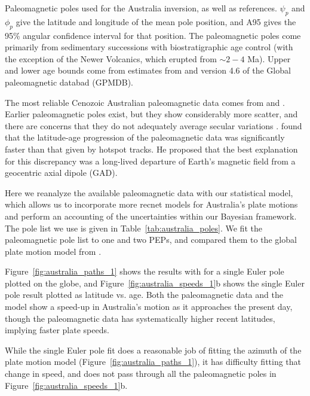 \documentclass[preprint,12pt,authoryear]{elsarticle}
\begin{document}
\begin{table}
\scriptsize

\caption{Paleomagnetic poles used for the Australia inversion, as well as references. 
$\psi_p$ and $\phi_p$ give the latitude and longitude of the mean pole position, and A95 gives the 95\% angular confidence interval for that position.
The paleomagnetic poles come primarily from sedimentary successions with biostratigraphic age control 
(with the exception of the Newer Volcanics, which erupted from $\sim2-4$ Ma).
Upper and lower age bounds come from estimates from \citet{idnurm1985lateI} and version 4.6 of the Global paleomagnetic databad (GPMDB). }
\label{tab:australia_poles}
\end{table}

The most reliable Cenozoic Australian paleomagnetic data comes from \citet{idnurm1985lateI} and \citet{idnurm1994new}.
Earlier paleomagnetic poles exist, but they show considerably more scatter,
and there are concerns that they do not adequately average secular variations
\citep{idnurm1985lateI, klootwijk2009sedimentary}.
\citet{idnurm1985lateII} found that the latitude-age progression of the paleomagnetic
data was significantly faster than that given by hotspot tracks.
He proposed that the best explanation for this discrepancy was a long-lived
departure of Earth's magnetic field from a geocentric axial dipole (GAD).

Here we reanalyze the available paleomagnetic data with our statistical model,
which allows us to incorporate more recnet models for Australia's plate motions
and perform an accounting of the uncertainties within our Bayesian framework.
The pole list we use is given in Table~\ref{tab:australia_poles}.
We fit the paleomagnetic pole list to one and two PEPs, and compared them
to the global plate motion model from \citet{seton2012global}.

Figure~\ref{fig:australia_paths_1} shows the results with for a single Euler pole
plotted on the globe, and Figure~\ref{fig:australia_speeds_1}b shows the single Euler pole result
plotted as latitude vs. age.
Both the paleomagnetic data and the \citet{seton2012global} model show a speed-up in
Australia's motion as it approaches the present day, though the paleomagnetic data
has systematically higher recent latitudes, implying faster plate speeds.

While the single Euler pole fit does a reasonable job of fitting the azimuth of the plate motion model 
(Figure~\ref{fig:australia_paths_1}), it has difficulty fitting that change in speed, 
and does not pass through all the paleomagnetic poles in Figure~\ref{fig:australia_speeds_1}b.
\end{document}
